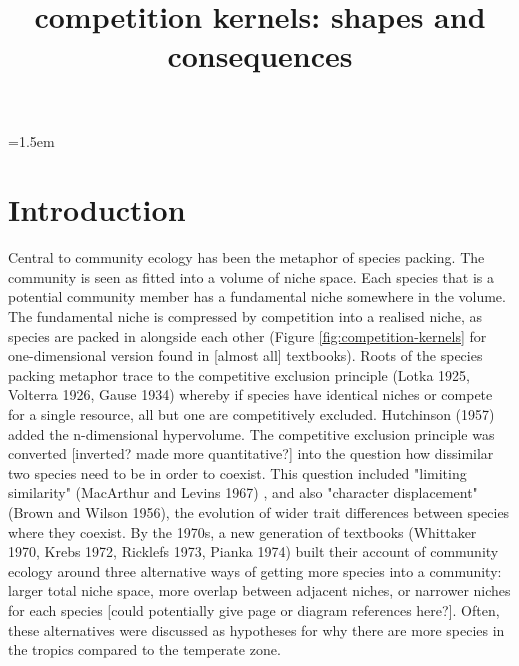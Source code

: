 \documentclass[a4paper,11pt]{article}
\title{competition kernels: shapes and consequences}
\author{}
\date{}
\affiliation{}
\begin{document}

\parindent=1.5em
\addtolength{\parskip}{.3em}


\section{Introduction}


Central to community ecology has been the metaphor of species packing. The community is seen as fitted into a volume of niche space. Each species that is a potential community member has a fundamental niche somewhere in the volume. The fundamental niche is compressed by competition into a realised niche, as species are packed in alongside each other (Figure \ref{fig:competition-kernels} for one-dimensional version found in [almost all] textbooks). Roots of the species packing metaphor trace to the competitive exclusion principle (Lotka 1925, Volterra 1926, Gause 1934) whereby if species have identical niches or compete for a single resource, all but one are competitively excluded. Hutchinson (1957) added the n-dimensional hypervolume. The  competitive exclusion principle was converted [inverted? made more quantitative?] into the question how dissimilar two species need to be in order to coexist. This question included "limiting similarity" (MacArthur and Levins 1967) \citep{MacArthur-1967}, and also "character displacement" (Brown and Wilson 1956), the evolution of wider trait differences between species where they coexist. By the 1970s, a new generation of textbooks (Whittaker 1970, Krebs 1972, Ricklefs 1973, Pianka 1974) built their account of community ecology around three alternative ways of getting more species into a community: larger total niche space, more overlap between adjacent niches, or narrower niches for each species [could potentially give page or diagram references here?]. Often, these alternatives were discussed as hypotheses for why there are more species in the tropics compared to the temperate zone.

\end{document}
